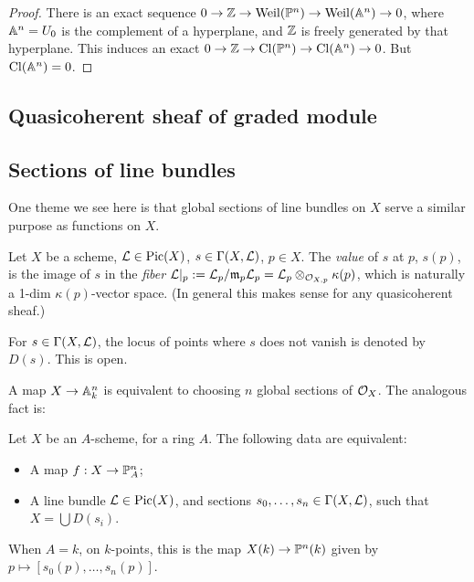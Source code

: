 \documentclass[11pt]{amsart}
\begin{document}
\begin{proof}
    There is an exact sequence $0\to \ZZ\to \operatorname{Weil}(\PP^n) \to \operatorname{Weil}(\AA^n)\to 0$, where $\AA^n = U_0$ is the complement of a hyperplane, and $\ZZ$ is freely generated by that hyperplane. This induces an exact $0\to \ZZ\to \Cl(\PP^n)\to \Cl(\AA^n)\to 0$. But $\Cl(\AA^n) = 0$.
\end{proof}


\subsection{Quasicoherent sheaf of graded module}




\subsection{Sections of line bundles}

One theme we see here is that global sections of line bundles on $X$ serve a similar purpose as functions on $X$.

\begin{defn}
    Let $X$ be a scheme, $\cL\in \Pic(X)$, $s \in \Gamma(X, \cL)$, $p\in X$. The \emph{value} of $s$ at $p$, $s(p)$, is the image of $s$ in the \emph{fiber} $\cL|_p := \cL_p/\fm_p\cL_p = \cL_p\otimes_{\cO_{X,p}} \kappa(p)$, which is naturally a 1-dim $\kappa(p)$-vector space. (In general this makes sense for any quasicoherent sheaf.)

    For $s\in \Gamma(X,\cL)$, the locus of points where $s$ does not vanish is denoted by $D(s)$. This is open.
\end{defn}

A map $X\to \AA_k^n$ is equivalent to choosing $n$ global sections of $\cO_X$. The analogous fact is:

\begin{prop}
    Let $X$ be an $A$-scheme, for a ring $A$. The following data are equivalent:
    \begin{itemize}
        \item A map $f: X\to \PP_A^n$;
        \item A line bundle $\cL\in \Pic(X)$, and sections $s_0,\dots,s_n\in \Gamma(X,\cL)$, such that $X = \bigcup D(s_i)$.
    \end{itemize}
\end{prop}

When $A=k$, on $k$-points, this is the map $X(k)\to \PP^n(k)$ given by $p \mapsto [s_0(p),\dots,s_n(p)]$.
\end{document}
